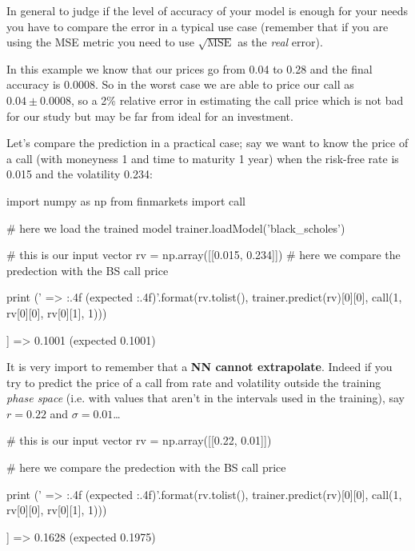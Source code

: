 In general to judge if the level of accuracy of your model is enough for your needs you have to 
compare the error in a typical use case (remember that if you are using the MSE metric you need to use
\(\sqrt{\mathrm{MSE}}\) as the \emph{real} error).

In this example we know that our prices go from 0.04 to 0.28 and the
final accuracy is 0.0008. So in the
worst case we are able to price our call as \(0.04 \pm 0.0008\), so a 2\% relative 
error in estimating the call price which is not bad for our study but may be far from ideal for 
an investment.

Let's compare the prediction in a practical case; say we
want to know the price of a call (with moneyness 1 and time to maturity
1 year) when the risk-free rate is 0.015 and the volatility 0.234:

\begin{ipython}
import numpy as np
from finmarkets import call

# here we load the trained model
trainer.loadModel('black_scholes')

# this is our input vector
rv = np.array([[0.015, 0.234]])
# here we compare the predection with the BS call price

print ('{} => {:.4f} (expected {:.4f})'.format(rv.tolist(),
                                               trainer.predict(rv)[0][0],
                                               call(1, rv[0][0], rv[0][1], 1)))
\end{ipython}
\begin{ioutput}
[[0.015, 0.234]] => 0.1001 (expected 0.1001)
\end{ioutput}

It is very import to remember that a \textbf{NN cannot extrapolate}.
Indeed if you try to predict the price of a call from rate and
volatility outside the training \emph{phase space} (i.e. with values that
aren't in the intervals used in the training), say \(r = 0.22\) and
\(\sigma = 0.01\)\ldots{}

\begin{ipython}
# this is our input vector
rv = np.array([[0.22, 0.01]])

# here we compare the predection with the BS call price

print ('{} => {:.4f} (expected {:.4f})'.format(rv.tolist(),
                                        trainer.predict(rv)[0][0],
                                        call(1, rv[0][0], rv[0][1], 1)))
\end{ipython}
\begin{ioutput}
[[0.22, 0.01]] => 0.1628 (expected 0.1975)
\end{ioutput}

